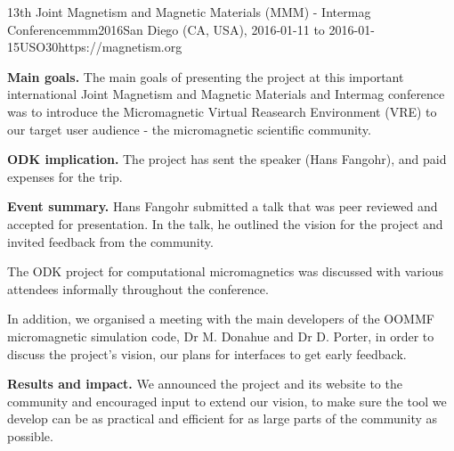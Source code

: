 \begin{event}{13th Joint Magnetism and Magnetic Materials (MMM) -
    Intermag Conference}{mmm2016}{San Diego (CA, USA), 2016-01-11 to
    2016-01-15}{USO}{30}{https://magnetism.org}

  \textbf{Main goals.} The main goals of presenting the project at
  this important international Joint Magnetism and Magnetic Materials
  and Intermag conference was to introduce the Micromagnetic Virtual
  Reasearch Environment (VRE) to our target user audience - the
  micromagnetic scientific community.


\textbf{ODK implication.} The \ODK project has sent the
speaker (Hans Fangohr), and paid expenses for the trip.

\textbf{Event summary.} Hans Fangohr submitted a talk \cite{16FangohrOOMMF} that was peer
reviewed and accepted for presentation. In the talk, he outlined the
vision for the project and invited feedback from the community.

The ODK project for computational micromagnetics was discussed with
various attendees informally throughout the conference.

In addition, we organised a meeting with the main developers of the
OOMMF micromagnetic simulation code, Dr M. Donahue and
Dr D. Porter, in order to discuss the project's vision, our plans for
interfaces to get early feedback.


\textbf{Results and impact.} We announced the project and its website
to the community and encouraged input to extend our vision, to make
sure the tool we develop can be as practical and efficient for as
large parts of the community as possible.

\end{event}
